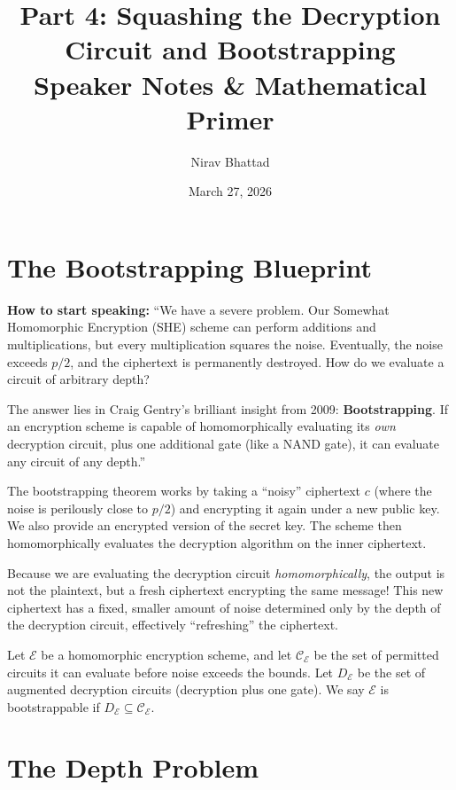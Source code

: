 \documentclass[11pt]{article}
\author{Nirav Bhattad}
\date{March 27, 2026}
\title{Part 4: Squashing the Decryption Circuit and Bootstrapping \\ \large Speaker Notes \& Mathematical Primer}
\begin{document}
\maketitle

\section{The Bootstrapping Blueprint}

\begin{speakernote}
\textbf{How to start speaking:} 
``We have a severe problem. Our Somewhat Homomorphic Encryption (SHE) scheme can perform additions and multiplications, but every multiplication squares the noise. Eventually, the noise exceeds $p/2$, and the ciphertext is permanently destroyed. How do we evaluate a circuit of arbitrary depth?

The answer lies in Craig Gentry's brilliant insight from 2009: \textbf{Bootstrapping}. If an encryption scheme is capable of homomorphically evaluating its \textit{own} decryption circuit, plus one additional gate (like a NAND gate), it can evaluate any circuit of any depth.''
\end{speakernote}

The bootstrapping theorem works by taking a ``noisy'' ciphertext $c$ (where the noise is perilously close to $p/2$) and encrypting it again under a new public key. We also provide an encrypted version of the secret key. The scheme then homomorphically evaluates the decryption algorithm on the inner ciphertext. 

Because we are evaluating the decryption circuit \textit{homomorphically}, the output is not the plaintext, but a fresh ciphertext encrypting the same message! This new ciphertext has a fixed, smaller amount of noise determined only by the depth of the decryption circuit, effectively ``refreshing'' the ciphertext.

\begin{definition}
Let $\mathcal{E}$ be a homomorphic encryption scheme, and let $\mathcal{C}_{\mathcal{E}}$ be the set of permitted circuits it can evaluate before noise exceeds the bounds. Let $D_{\mathcal{E}}$ be the set of augmented decryption circuits (decryption plus one gate). We say $\mathcal{E}$ is bootstrappable if $D_{\mathcal{E}} \subseteq \mathcal{C}_{\mathcal{E}}$.
\end{definition}

\section{The Depth Problem}
\end{document}
